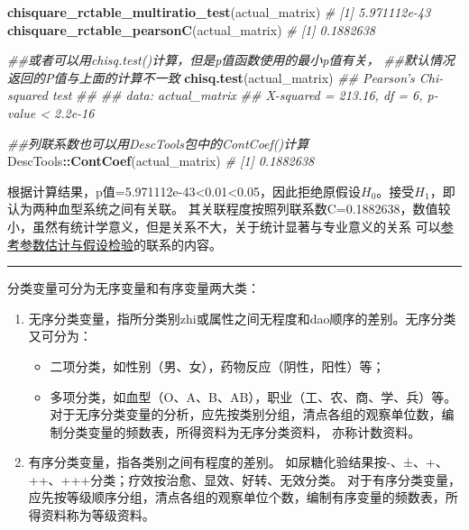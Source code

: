 \documentclass[
]{article}
\newenvironment{Shaded}{\begin{snugshade}}{\end{snugshade}}
\newcommand{\CommentTok}[1]{\textcolor[rgb]{0.56,0.35,0.01}{\textit{#1}}}
\newcommand{\KeywordTok}[1]{\textcolor[rgb]{0.13,0.29,0.53}{\textbf{#1}}}
\newcommand{\NormalTok}[1]{#1}
\newcommand{\OperatorTok}[1]{\textcolor[rgb]{0.81,0.36,0.00}{\textbf{#1}}}
\providecommand{\tightlist}{%
  \setlength{\itemsep}{0pt}\setlength{\parskip}{0pt}}
\begin{document}
\begin{Shaded}
\begin{Highlighting}[]
\KeywordTok{chisquare_rctable_multiratio_test}\NormalTok{(actual_matrix)}
\CommentTok{# [1] 5.971112e-43}
\KeywordTok{chisquare_rctable_pearsonC}\NormalTok{(actual_matrix)}
\CommentTok{# [1] 0.1882638}

\CommentTok{##或者可以用chisq.test()计算，但是p值函数使用的最小p值有关，}
\CommentTok{##默认情况返回的P值与上面的计算不一致}
\KeywordTok{chisq.test}\NormalTok{(actual_matrix)}
\CommentTok{##      Pearson's Chi-squared test}
\CommentTok{##  }
\CommentTok{##  data:  actual_matrix}
\CommentTok{##  X-squared = 213.16, df = 6, p-value < 2.2e-16}

\CommentTok{##列联系数也可以用DescTools包中的ContCoef()计算}
\NormalTok{DescTools}\OperatorTok{::}\KeywordTok{ContCoef}\NormalTok{(actual_matrix)}
\CommentTok{# [1] 0.1882638}
\end{Highlighting}
\end{Shaded}

根据计算结果，p值=5.971112e-43\textless0.01\textless0.05，因此拒绝原假设\(H_0\)。接受\(H_1\)，即认为两种血型系统之间有关联。
其关联程度按照列联系数C=0.1882638，数值较小，虽然有统计学意义，但是关系不大，关于统计显著与专业意义的关系
可以\protect\hyperlink{ux53c2ux6570ux4f30ux8ba1ux4e0eux5047ux8bbeux68c0ux9a8cux7684ux8054ux7cfb}{参考参数估计与假设检验}的联系的内容。

\begin{center}\rule{0.5\linewidth}{0.5pt}\end{center}

分类变量可分为无序变量和有序变量两大类：

\begin{enumerate}
\def\labelenumi{\arabic{enumi}.}
\tightlist
\item
  无序分类变量，指所分类别zhi或属性之间无程度和dao顺序的差别。无序分类又可分为：

  \begin{itemize}
  \tightlist
  \item
    二项分类，如性别（男、女），药物反应（阴性，阳性）等；
  \item
    多项分类，如血型（O、A、B、AB），职业（工、农、商、学、兵）等。
    对于无序分类变量的分析，应先按类别分组，清点各组的观察单位数，编制分类变量的频数表，所得资料为无序分类资料，
    亦称计数资料。
  \end{itemize}
\item
  有序分类变量，指各类别之间有程度的差别。
  如尿糖化验结果按-、±、+、++、+++分类；疗效按治愈、显效、好转、无效分类。
  对于有序分类变量，应先按等级顺序分组，清点各组的观察单位个数，编制有序变量的频数表，所得资料称为等级资料。
\end{enumerate}
\end{document}
